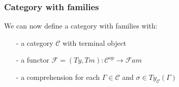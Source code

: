 \documentclass[aspectratio=169]{beamer}
\newcommand{\Fami}{\mathcal{F}am}
\newcommand{\cate}{\mathcal{C}}
\newcommand{\types}{Ty_{\cate}}
\begin{document}
    \begin{frame}
        \frametitle{Category with families}
        We can now define a category with families with:
        \begin{itemize}
            \item[-] a category $\cate$ with terminal object
            \item[-] a functor $\mathcal{F} = (Ty,Tm):\cate^{op}\to \Fami$
            \item[-] a comprehension for each $\Gamma\in\cate$ and $\sigma\in\types(\Gamma)$  
        \end{itemize}
    \end{frame}
\end{document}
